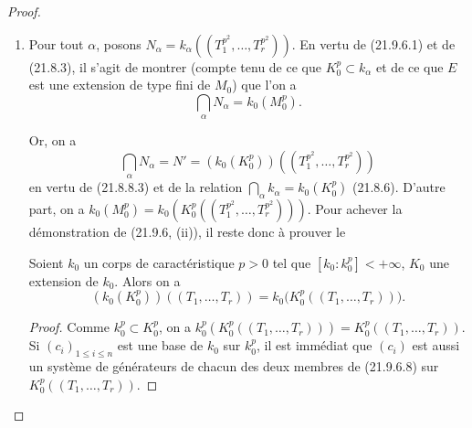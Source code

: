 \begin{proof}
\begin{enumerate}
  Mais comme $L_0$ est séparable sur $K_0$ (21.9.6.4), on a
  $d(L_0/K_0,k)=0$, et par suite aussi $d(L_0/M_0,k)=0$ ((21.6.2) et
  (21.6.4)). Il vient donc
  \[
    \delta=d(E/L_0,M/k_0)+d(L_0/M_0,N/k).
  \]

  Appliquons encore deux fois (21.6.4.2) au premier terme du second membre de
  cette formule~; on obtient
  \[
    d(E/L_0,M/k_0)=d(E/L_0,M/N)+d(E/L_0,N/k)+d(E/L_0,k/k_0).
  \]

  Comme $M\subset N(L_0^p)$, on a $d(E/L_0,M/N)=0$ (21.6.2), donc (par
  (21.6.4.4))
  \[
    \delta=d(E/L_0,k/k_0)+d(E/M_0,N/k).
  \]

  Mais $M_0$ et $L_0$ sont des extensions séparables de $K_0$ (21.9.6.4),
  donc
  $d(L_0/K_0,k/k_0)=d(M_0/K_0,k/k_0)=0$
  (21.6.2), et appliquant encore deux fois (21.6.4.4),
  on a
  $d(E/L_0,k/k_0)=d(E/K_0,k/k_0)=d(E/M_0,k/k_0)$,
  d'où, par une dernière application de (21.6.4.2),
  \[
    \delta=d(E/M_0,N/k_0)\geqslant0
  \]
  ce qui prouve (21.9.6.1). En outre, lorsque $k$ est remplacé par une
  sous-extension $k'$ de $k_0$, $N$ est remplacé par une sous-extension $N'$,
  donc $d(E/M_0,N'/k_0)\leqslant d(E/M_0,N/k_0)$ (21.6.4.2), ce qui démontre
  la dernière assertion de (i).

  \item[(ii)] Pour tout $\alpha$, posons
  $N_\alpha=k_\alpha((T_1^{p^2},\ldots,T_r^{p^2}))$. En vertu de (21.9.6.1)
  et de (21.8.3), il s'agit de montrer (compte tenu de ce que
  $K_0^p\subset k_\alpha$ et de ce que $E$ est une extension de type fini de
  $M_0$) que l'on a
  \[
    \bigcap_\alpha N_\alpha=k_0(M_0^p).
  \]

  Or, on a
  \begin{equation}
  \tag{21.9.6.6}
  \label{0.21.9.6.6-fr}
    \bigcap_\alpha N_\alpha=N'
    =(k_0(K_0^p))((T_1^{p^2},\ldots,T_r^{p^2}))
  \end{equation}
  en vertu de (21.8.8.3) et de la relation
  $\bigcap_\alpha k_\alpha=k_0(K_0^p)$ (21.8.6). D'autre part, on a
  $k_0(M_0^p)=k_0(K_0^p((T_1^{p^2},\ldots,T_r^{p^2})))$. Pour achever la
  démonstration de (21.9.6, (ii)), il reste donc à prouver le

  \begin{lemma}[21.9.6.7]
  \label{0.21.9.6.7-fr}
  Soient $k_0$ un corps de caractéristique $p>0$ tel que
  $[k_0:k_0^p]<+\infty$, $K_0$ une extension de $k_0$. Alors on a
  \begin{equation}
  \tag{21.9.6.8}
  \label{0.21.9.6.8-fr}
    (k_0(K_0^p))((T_1,\ldots,T_r))
    =k_0\bigl(K_0^p((T_1,\ldots,T_r))\bigr).
  \end{equation}
  \end{lemma}

  \begin{proof}
  Comme $k_0^p\subset K_0^p$, on a
  $k_0^p(K_0^p((T_1,\ldots,T_r)))=K_0^p((T_1,\ldots,T_r))$.
  Si $(c_i)_{1\leqslant i\leqslant n}$ est une base de $k_0$ sur $k_0^p$,
  il est immédiat que $(c_i)$ est aussi un système de générateurs de chacun
  des deux membres de (21.9.6.8) sur $K_0^p((T_1,\ldots,T_r))$.
  \end{proof}
\end{enumerate}
\end{proof}

